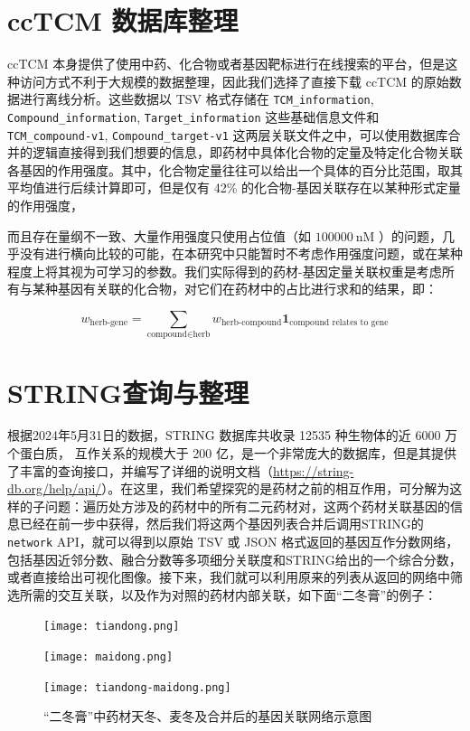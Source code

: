 \section{ccTCM 数据库整理}

ccTCM 本身提供了使用中药、化合物或者基因靶标进行在线搜索的平台，但是这种访问方式不利于大规模的数据整理，因此我们选择了直接下载 ccTCM 的原始数据进行离线分析。这些数据以 TSV 格式存储在 \texttt{TCM\_information}, \texttt{Compound\_information}, \texttt{Target\_information} 这些基础信息文件和 \texttt{TCM\_compound-v1}, \texttt{Compound\_target-v1} 这两层关联文件之中，可以使用数据库合并的逻辑直接得到我们想要的信息，即药材中具体化合物的定量及特定化合物关联各基因的作用强度。其中，化合物定量往往可以给出一个具体的百分比范围，取其平均值进行后续计算即可，但是仅有 42\% 的化合物-基因关联存在以某种形式定量的作用强度，

而且存在量纲不一致、大量作用强度只使用占位值（如 $100000~\mathrm{nM}$ ）的问题，几乎没有进行横向比较的可能，在本研究中只能暂时不考虑作用强度问题，或在某种程度上将其视为可学习的参数。我们实际得到的药材-基因定量关联权重是考虑所有与某种基因有关联的化合物，对它们在药材中的占比进行求和的结果，即：


$$
w_{\text{herb-gene}} = \sum_{\text{compound} \in \text{herb}} w_{\text{herb-compound}} \mathbf{1}_{\text{compound relates to gene}}
$$

\section{STRING查询与整理}

根据2024年5月31日的数据，STRING 数据库共收录 12535 种生物体的近 6000 万个蛋白质， 互作关系的规模大于 200 亿，是一个非常庞大的数据库，但是其提供了丰富的查询接口，并编写了详细的说明文档（\url{https://string-db.org/help/api/}）。在这里，我们希望探究的是药材之前的相互作用，可分解为这样的子问题：遍历处方涉及的药材中的所有二元药材对，这两个药材关联基因的信息已经在前一步中获得，然后我们将这两个基因列表合并后调用STRING的 \texttt{network} API，就可以得到以原始 TSV 或 JSON 格式返回的基因互作分数网络，包括基因近邻分数、融合分数等多项细分关联度和STRING给出的一个综合分数，或者直接给出可视化图像。接下来，我们就可以利用原来的列表从返回的网络中筛选所需的交互关联，以及作为对照的药材内部关联，如下面“二冬膏”的例子：


\begin{figure}[H]
  \centering
  \begin{minipage}[b]{0.4\textwidth}
      \centering
      \texttt{[image: tiandong.png]} %
  \end{minipage}
  \hspace{0.05\textwidth} %
  \begin{minipage}[b]{0.4\textwidth}
      \centering
      \texttt{[image: maidong.png]} %
  \end{minipage}

  \begin{minipage}[b]{0.95\textwidth}
      \centering
      \texttt{[image: tiandong-maidong.png]} %
  \end{minipage}
  \caption{“二冬膏”中药材天冬、麦冬及合并后的基因关联网络示意图}
\end{figure}

